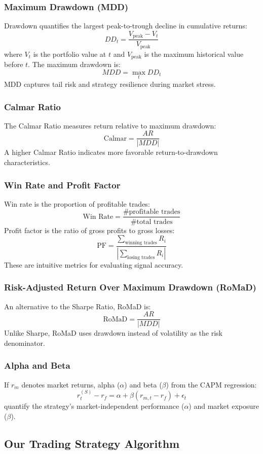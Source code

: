 \subsubsection{Maximum Drawdown (MDD)}  
Drawdown quantifies the largest peak-to-trough decline in cumulative returns:
\[
DD_t = \frac{V_{\text{peak}} - V_t}{V_{\text{peak}}}
\]
where $V_t$ is the portfolio value at $t$ and $V_{\text{peak}}$ is the maximum historical value before $t$. The maximum drawdown is:
\[
MDD = \max_{t} DD_t
\]
MDD captures tail risk and strategy resilience during market stress.

\subsubsection{Calmar Ratio}  
The Calmar Ratio measures return relative to maximum drawdown:
\[
\text{Calmar} = \frac{AR}{|MDD|}
\]
A higher Calmar Ratio indicates more favorable return-to-drawdown characteristics.

\subsubsection{Win Rate and Profit Factor}  
Win rate is the proportion of profitable trades:
\[
\text{Win Rate} = \frac{\text{\# profitable trades}}{\text{\# total trades}}
\]
Profit factor is the ratio of gross profits to gross losses:
\[
\text{PF} = \frac{\sum_{\text{winning trades}} R_i}{\left| \sum_{\text{losing trades}} R_i \right|}
\]
These are intuitive metrics for evaluating signal accuracy.

\subsubsection{Risk-Adjusted Return Over Maximum Drawdown (RoMaD)}  
An alternative to the Sharpe Ratio, RoMaD is:
\[
\text{RoMaD} = \frac{AR}{|MDD|}
\]
Unlike Sharpe, RoMaD uses drawdown instead of volatility as the risk denominator.

\subsubsection{Alpha and Beta}  
If $r_m$ denotes market returns, alpha ($\alpha$) and beta ($\beta$) from the CAPM regression:
\[
r_t^{(S)} - r_f = \alpha + \beta (r_{m,t} - r_f) + \epsilon_t
\]
quantify the strategy's market-independent performance ($\alpha$) and market exposure ($\beta$).

\subsection{Our Trading Strategy Algorithm}

